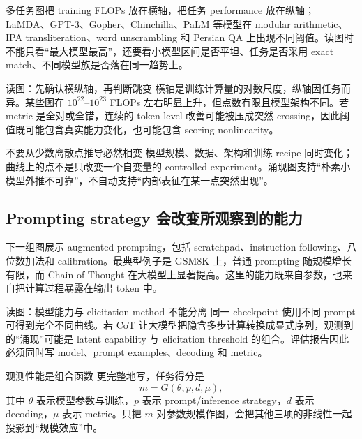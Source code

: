 多任务图把 training FLOPs 放在横轴，把任务 performance 放在纵轴；LaMDA、GPT-3、Gopher、Chinchilla、PaLM 等模型在 modular arithmetic、IPA transliteration、word unscrambling 和 Persian QA 上出现不同阈值。读图时不能只看“最大模型最高”，还要看小模型区间是否平坦、任务是否采用 exact match、不同模型族是否落在同一趋势上。


\begin{knowledgebox}{读图：先确认横纵轴，再判断跳变}
横轴是训练计算量的对数尺度，纵轴因任务而异。某些图在 $10^{22}$--$10^{23}$ FLOPs 左右明显上升，但点数有限且模型架构不同。若 metric 是全对或全错，连续的 token-level 改善可能被压成突然 crossing，因此阈值既可能包含真实能力变化，也可能包含 scoring nonlinearity。
\end{knowledgebox}

\begin{warningbox}{不要从少数离散点推导必然相变}
模型规模、数据、架构和训练 recipe 同时变化；曲线上的点不是只改变一个自变量的 controlled experiment。涌现图支持“朴素小模型外推不可靠”，不自动支持“内部表征在某一点突然出现”。
\end{warningbox}

\subsection{Prompting strategy 会改变所观察到的能力}

下一组图展示 augmented prompting，包括 scratchpad、instruction following、八位数加法和 calibration。最典型例子是 GSM8K 上，普通 prompting 随规模增长有限，而 Chain-of-Thought 在大模型上显著提高。这里的能力既来自参数，也来自把计算过程暴露在输出 token 中。


\begin{knowledgebox}{读图：模型能力与 elicitation method 不能分离}
同一 checkpoint 使用不同 prompt 可得到完全不同曲线。若 CoT 让大模型把隐含多步计算转换成显式序列，观测到的“涌现”可能是 latent capability 与 elicitation threshold 的组合。评估报告因此必须同时写 model、prompt examples、decoding 和 metric。
\end{knowledgebox}

\begin{importantbox}{观测性能是组合函数}
更完整地写，任务得分是
\[
m=G(\theta, p, d, \mu),
\]
其中 $\theta$ 表示模型参数与训练，$p$ 表示 prompt/inference strategy，$d$ 表示 decoding，$\mu$ 表示 metric。只把 $m$ 对参数规模作图，会把其他三项的非线性一起投影到“规模效应”中。
\end{importantbox}

